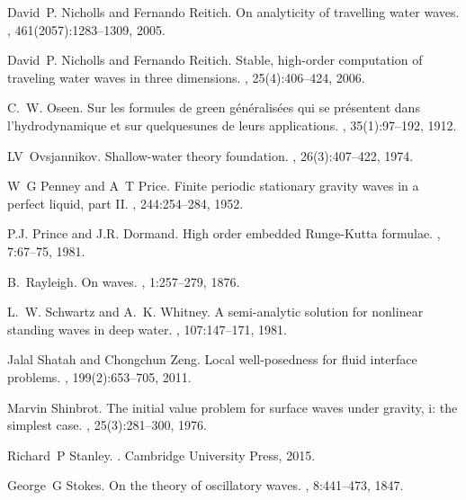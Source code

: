 \documentclass[11pt]{article}
\theoremstyle{plain}
\theoremstyle{definition}
\theoremstyle{definition}
\begin{document}
\begin{thebibliography}{10}
David~P. Nicholls and Fernando Reitich.
\newblock On analyticity of travelling water waves.
,
  461(2057):1283--1309, 2005.

David~P. Nicholls and Fernando Reitich.
\newblock Stable, high-order computation of traveling water waves in three
  dimensions.
, 25(4):406--424, 2006.

C.~W. Oseen.
\newblock Sur les formules de green g{é}n{é}ralis{é}es qui se pr{é}sentent
  dans l'hydrodynamique et sur quelquesunes de leurs applications.
, 35(1):97--192, 1912.

LV~Ovsjannikov.
\newblock Shallow-water theory foundation.
, 26(3):407--422, 1974.

W~G Penney and A~T Price.
\newblock Finite periodic stationary gravity waves in a perfect liquid, part
  {II}.
, 244:254--284, 1952.

P.J. Prince and J.R. Dormand.
\newblock High order embedded {R}unge-{K}utta formulae.
, 7:67--75, 1981.

B.~Rayleigh.
\newblock On waves.
, 1:257--279, 1876.

L.~W. Schwartz and A.~K. Whitney.
\newblock A semi-analytic solution for nonlinear standing waves in deep water.
, 107:147--171, 1981.

Jalal Shatah and Chongchun Zeng.
\newblock Local well-posedness for fluid interface problems.
, 199(2):653--705,
  2011.

Marvin Shinbrot.
\newblock The initial value problem for surface waves under gravity, i: the
  simplest case.
, 25(3):281--300, 1976.

Richard~P Stanley.
.
\newblock Cambridge University Press, 2015.

George~G Stokes.
\newblock On the theory of oscillatory waves.
, 8:441--473, 1847.


\end{thebibliography}
\end{document}
